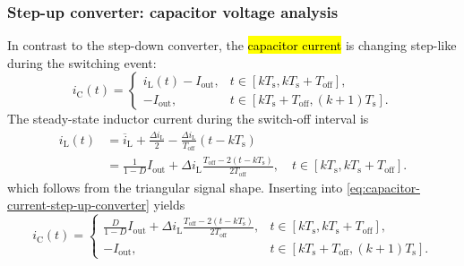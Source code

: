 \begin{frame}
    \frametitle{Step-up converter: capacitor voltage analysis}
     In contrast to the step-down converter, the \hl{capacitor current} is changing step-like during the switching event:
     \begin{equation}
        i_\mathrm{C}(t) = \begin{cases}
            i_\mathrm{L}(t) - I_\mathrm{out}, & t\in [k T_\mathrm{s}, k T_\mathrm{s} + T_\mathrm{off}],\\
            -I_\mathrm{out}, & t\in [k T_\mathrm{s}+ T_\mathrm{off}, (k+1) T_\mathrm{s}].
        \end{cases}
        \label{eq:capacitor-current-step-up-converter}
    \end{equation}
  The steady-state inductor current during the switch-off interval is
  \begin{equation}
    \begin{split}
        i_\mathrm{L}(t) &= \overline{i}_\mathrm{L} + \frac{\Delta i_\mathrm{L}}{2} - \frac{\Delta i_\mathrm{L}}{T_\mathrm{off}}(t-kT_\mathrm{s})\\
        &= \frac{1}{1-D}I_\mathrm{out} + \Delta i_\mathrm{L} \frac{T_\mathrm{off}-2(t-kT_\mathrm{s})}{2T_\mathrm{off}}, \quad t\in [k T_\mathrm{s}, k T_\mathrm{s} + T_\mathrm{off}].
    \end{split}
  \end{equation}
  which follows from the triangular signal shape. Inserting into \eqref{eq:capacitor-current-step-up-converter} yields
  \begin{equation}
    i_\mathrm{C}(t) = \begin{cases}
        \frac{D}{1-D}I_\mathrm{out} + \Delta i_\mathrm{L} \frac{T_\mathrm{off}-2(t-kT_\mathrm{s})}{2T_\mathrm{off}}, & t\in [k T_\mathrm{s}, k T_\mathrm{s} + T_\mathrm{off}],\\
        -I_\mathrm{out}, & t\in [k T_\mathrm{s}+ T_\mathrm{off}, (k+1) T_\mathrm{s}].
    \end{cases}
\end{equation}
\end{frame}


